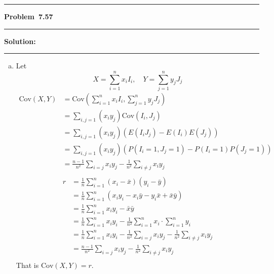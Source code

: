 \documentclass[10.5pt]{article}
\newcommand\question[1]{\vspace{.2in}\hrule\vspace{0.04in}\textbf{Problem\ #1}\vspace{.4em}\hrule\vspace{.10in}}
\newcommand\Solution{\vspace{.3in}\textbf{Solution:}\vspace{.5em}\hrule\vspace{.08in}\par}
\begin{document}
\question{7.57}
\Solution{}
\begin{enumerate}[(a)]
	\item Let $$X=\sum_{i = 1}^n x_iI_i,\quad Y=\sum_{j = 1}^ny_jJ_j$$
	\begin{align*}
		\text{Cov}(X, Y)
		&=\text{Cov}\left(\sum_{i = 1}^n x_iI_i, \sum_{j = 1}^ny_jJ_j\right)\\[6pt]
		&= \sum_{i, j = 1}(x_iy_j)\text{Cov}(I_i, J_j)\\[6pt]
		&= \sum_{i, j = 1}(x_iy_j)(E(I_iJ_j)-E(I_i)E(J_j))\\[6pt]
		&= \sum_{i, j = 1}(x_iy_j)(P(I_i = 1, J_j = 1)-P(I_i = 1)P(J_j = 1))\\[6pt]
		&= \frac{n-1}{n^2}\sum_{i=j}x_iy_j-\frac{1}{n^2}\sum_{i\neq j}x_iy_j\\[6pt]
	\end{align*}
	\begin{align*}
		r
		&= \frac{1}{n}\sum_{i=1}^n(x_i-\bar{x})(y_i-\bar{y})\\[6pt]
		&= \frac{1}{n}\sum_{i = 1}^n(x_iy_i-x_i\bar{y}-y_i\bar{x}+\bar{x}\bar{y})\\[6pt]
		&= \frac{1}{n}\sum_{i = 1}^nx_iy_i - \bar{x}\bar{y}\\[6pt]
		&= \frac{1}{n}\sum_{i = 1}^nx_iy_i - \frac{1}{n^2}\sum_{i = 1}^nx_i\cdot\sum_{i = 1}^ny_i\\[6pt]
		&= \frac{1}{n}\sum_{i = 1}^nx_iy_i - \frac{1}{n^2}\sum_{i = j}x_iy_j-\frac{1}{n^2}\sum_{i \neq j}x_iy_j\\[6pt]
		&=\frac{n-1}{n^2}\sum_{i=j}x_iy_j-\frac{1}{n^2}\sum_{i\neq j}x_iy_j\\[6pt]
	\end{align*}
	That is $\text{Cov}(X, Y) = r$.
	

\end{enumerate}
\end{document}
